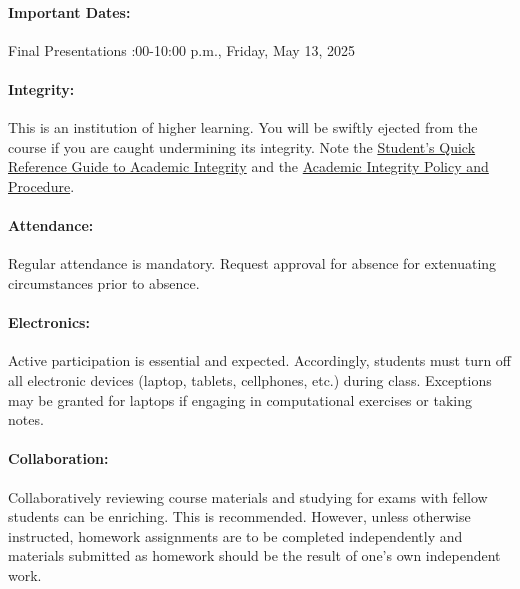 \documentclass[11pt, a4paper]{article}
\begin{document}
\paragraph{Important Dates:}
\begin{center} \begin{minipage}{3.8in}
\begin{flushleft}
Final Presentations       :00-10:00 p.m., Friday, May 13, 2025\\
\end{flushleft}
\end{minipage}
\end{center}

\paragraph{Integrity:} This is an institution of higher learning. You will 
        be swiftly ejected from the course if you are caught undermining its 
                integrity. Note the 
                \href{http://www.provost.illinois.edu/academicintegrity/students.html}{Student's 
                Quick Reference Guide to Academic Integrity} and the 
                \href{http://studentcode.illinois.edu/article1_part4_1-401.html}{Academic 
                Integrity Policy and Procedure}.
\paragraph{Attendance:} Regular attendance is mandatory. Request approval
        for absence for extenuating circumstances prior to absence.
\paragraph{Electronics:} Active participation is essential and expected.
        Accordingly, students must turn off all electronic devices (laptop,
        tablets, cellphones, etc.) during class. Exceptions may be granted for
        laptops if engaging in computational exercises or taking notes.
\paragraph{Collaboration:} Collaboratively reviewing course materials and
        studying for exams with fellow students can be enriching.  This is
                recommended.  However, unless otherwise instructed, homework
                assignments are to be completed independently and materials
                submitted as homework should be the result of one's own
                independent work.
\end{document}
